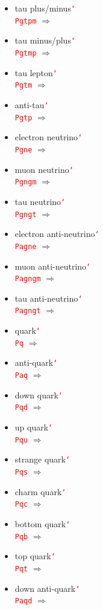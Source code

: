 \documentclass[12pt]{article}
\newcommand{\texcmd}[1]{\textcolor{red}{\texttt{\char`\\#1}}}
\begin{document}
\begin{multicols}{2}
{\begin{itemize}
\item tau plus/minus\newline \texcmd{Pgtpm} $\Rightarrow$ \Pgtpm
\item tau minus/plus\newline \texcmd{Pgtmp} $\Rightarrow$ \Pgtmp
\item tau lepton\newline \texcmd{Pgtm} $\Rightarrow$ \Pgtm
\item anti-tau\newline \texcmd{Pgtp} $\Rightarrow$ \Pgtp
\item electron neutrino\newline \texcmd{Pgne} $\Rightarrow$ \Pgne
\item muon neutrino\newline \texcmd{Pgngm} $\Rightarrow$ \Pgngm
\item tau neutrino\newline \texcmd{Pgngt} $\Rightarrow$ \Pgngt
\item electron anti-neutrino\newline \texcmd{Pagne} $\Rightarrow$ \Pagne
\item muon anti-neutrino\newline \texcmd{Pagngm} $\Rightarrow$ \Pagngm
\item tau anti-neutrino\newline \texcmd{Pagngt} $\Rightarrow$ \Pagngt
\item quark\newline \texcmd{Pq} $\Rightarrow$ \Pq
\item anti-quark\newline \texcmd{Paq} $\Rightarrow$ \Paq
\item down quark\newline \texcmd{Pqd} $\Rightarrow$ \Pqd
\item up quark\newline \texcmd{Pqu} $\Rightarrow$ \Pqu
\item strange quark\newline \texcmd{Pqs} $\Rightarrow$ \Pqs
\item charm quark\newline \texcmd{Pqc} $\Rightarrow$ \Pqc
\item bottom quark\newline \texcmd{Pqb} $\Rightarrow$ \Pqb
\item top quark\newline \texcmd{Pqt} $\Rightarrow$ \Pqt
\item down anti-quark\newline \texcmd{Paqd} $\Rightarrow$ \Paqd

\end{itemize}}
\end{multicols}
\end{document}

